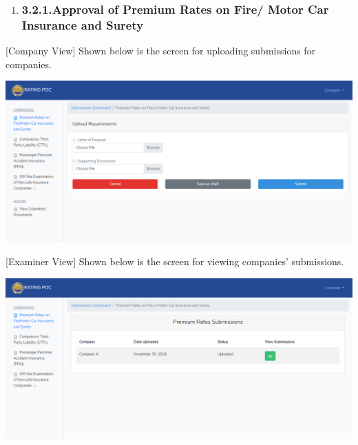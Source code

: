 \documentclass{article}
\begin{document}
\begin{enumerate}[noitemsep,topsep=\mdcompacttopsep]%

\item{}
\subsubsection{3.2.1.\hspace*{0.5em}Approval of Premium Rates on Fire/ Motor Car Insurance and Surety}\label{sec-approval-of-premium-rates-on-fire-motor-car-insurance-and-surety}%
\end{enumerate}%

\noindent{}[Company View] Shown below is the screen for
uploading submissions for companies.%

\includegraphics[keepaspectratio=true]{up-ic-screens/image164}{}%

[Examiner View] Shown below is the screen for viewing
companies’ submissions.%

\includegraphics[keepaspectratio=true]{up-ic-screens/image98}{}%
\end{document}
